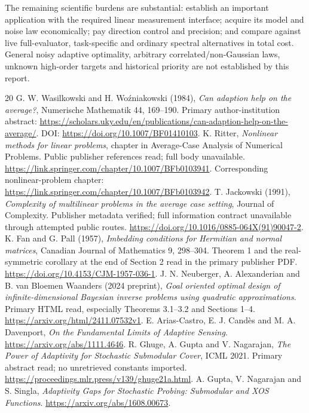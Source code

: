 \documentclass[11pt,a4paper]{article}
\begin{document}
The remaining scientific burdens are substantial: establish an important application with the required linear measurement interface; acquire its model and noise law economically; pay direction control and precision; and compare against live full-evaluator, task-specific and ordinary spectral alternatives in total cost. General noisy adaptive optimality, arbitrary correlated/non-Gaussian laws, unknown high-order targets and historical priority are not established by this report.

\clearpage
\begin{thebibliography}{20}
 G. W. Wasilkowski and H. Wo\'zniakowski (1984), \emph{Can adaption help on the average?}, Numerische Mathematik 44, 169--190. Primary author-institution abstract: \url{https://scholars.uky.edu/en/publications/can-adaption-help-on-the-average/}. DOI: \url{https://doi.org/10.1007/BF01410103}.
 K. Ritter, \emph{Nonlinear methods for linear problems}, chapter in Average-Case Analysis of Numerical Problems. Public publisher references read; full body unavailable. \url{https://link.springer.com/chapter/10.1007/BFb0103941}. Corresponding nonlinear-problem chapter: \url{https://link.springer.com/chapter/10.1007/BFb0103942}.
 T. Jackowski (1991), \emph{Complexity of multilinear problems in the average case setting}, Journal of Complexity. Publisher metadata verified; full information contract unavailable through attempted public routes. \url{https://doi.org/10.1016/0885-064X(91)90047-2}.
 K. Fan and G. Pall (1957), \emph{Imbedding conditions for Hermitian and normal matrices}, Canadian Journal of Mathematics 9, 298--304. Theorem 1 and the real-symmetric corollary at the end of Section 2 read in the primary publisher PDF. \url{https://doi.org/10.4153/CJM-1957-036-1}.
 J. N. Neuberger, A. Alexanderian and B. van Bloemen Waanders (2024 preprint), \emph{Goal oriented optimal design of infinite-dimensional Bayesian inverse problems using quadratic approximations}. Primary HTML read, especially Theorems 3.1--3.2 and Sections 1--4. \url{https://arxiv.org/html/2411.07532v1}.
 E. Arias-Castro, E. J. Cand\`es and M. A. Davenport, \emph{On the Fundamental Limits of Adaptive Sensing}. \url{https://arxiv.org/abs/1111.4646}.
 R. Ghuge, A. Gupta and V. Nagarajan, \emph{The Power of Adaptivity for Stochastic Submodular Cover}, ICML 2021. Primary abstract read; no unretrieved constants imported. \url{https://proceedings.mlr.press/v139/ghuge21a.html}.
 A. Gupta, V. Nagarajan and S. Singla, \emph{Adaptivity Gaps for Stochastic Probing: Submodular and XOS Functions}. \url{https://arxiv.org/abs/1608.00673}.

\end{thebibliography}
\end{document}
